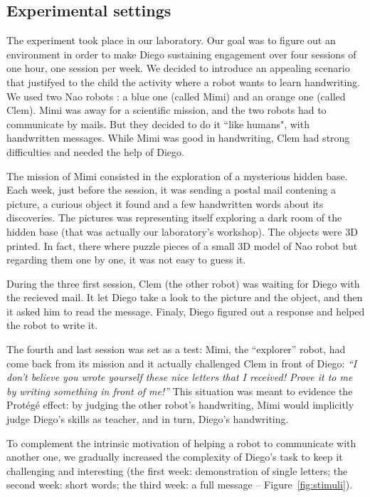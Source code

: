 \documentclass{sig-alternate}
\begin{document}
\subsection{Experimental settings}

The experiment took place in our laboratory. Our goal was to figure out 
an environment in order to make Diego sustaining
engagement over four sessions of one hour, one session per week. We decided 
to introduce an appealing scenario that justifyed to the child the activity 
where a robot wants to learn handwriting. We used two Nao robots : a blue one 
(called Mimi) and an orange one (called Clem). Mimi was away for a 
scientific mission, and the two robots had to communicate by mails. But they decided to do it 
``like humans", with handwritten messages. While Mimi was good in handwriting, 
Clem had strong difficulties and needed the help of Diego.

The mission of Mimi consisted in the exploration of a mysterious hidden
base. Each week, just before the session, it was sending a postal mail contening
a picture, a curious object it found and a few handwritten words about its discoveries. 
The pictures was representing itself exploring 
a dark room of the hidden base (that was actually our laboratory's workshop). 
The objects were 3D printed. In fact, there where puzzle pieces of a small 3D 
model of Nao robot but regarding them one by one, it was not easy to guess it.

During the three first session, Clem (the other robot) was waiting for Diego
with the recieved mail. It let Diego take a look to the picture and the object,
and then it asked him to read the message.
Finaly, Diego figured out a response and helped the robot to write it.

The fourth and last session was set as a test: Mimi, the ``explorer'' robot,
had come back from its mission and it actually challenged Clem in
front of Diego: \emph{``I don't believe you wrote yourself these nice letters that I
received! Prove it to me by writing something in front of me!''} This situation
was meant to evidence the Prot\'eg\'e effect: by judging the other robot's
handwriting, Mimi would implicitly judge Diego's skills as
teacher, and in turn, Diego's handwriting.

To complement the intrinsic motivation of helping a robot to communicate with another one, we
gradually increased the complexity of Diego's task to keep it challenging and
interesting (the first week: demonstration of single letters; the second week:
short words; the third week: a full message -- Figure~\ref{fig:stimuli}).
\end{document}
